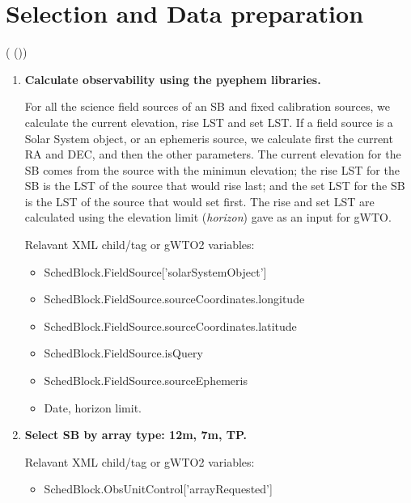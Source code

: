 \documentclass[a4paper,10pt,english]{sphinxmanual}
\begin{document}
\section{Selection and Data preparation}
\label{algorithm:selection}\label{algorithm:selection-and-data-preparation}
({\hyperref[wtoapi:wtoAlgorithm.WtoAlgorithm.selector]{}} ())
\begin{enumerate}
\item {} 
\textbf{Calculate observability using the pyephem libraries.}

For all the science field sources of an SB and fixed calibration sources,
we calculate the current elevation, rise LST and set LST.
If a field source is a Solar System object, or an ephemeris
source, we calculate first the current RA and DEC, and then the other
parameters. The current elevation for the SB comes from the source with the
minimun elevation; the rise LST for the SB is the LST of the source that
would rise last; and the set LST for the SB is the LST of the source that
would set first. The rise and set LST are calculated using the elevation
limit (\emph{horizon}) gave as an input for gWTO.

Relavant XML child/tag or gWTO2 variables:
\begin{itemize}
\item {} 
SchedBlock.FieldSource{[}'solarSystemObject'{]}

\item {} 
SchedBlock.FieldSource.sourceCoordinates.longitude

\item {} 
SchedBlock.FieldSource.sourceCoordinates.latitude

\item {} 
SchedBlock.FieldSource.isQuery

\item {} 
SchedBlock.FieldSource.sourceEphemeris

\item {} 
Date, horizon limit.

\end{itemize}

\item {} 
\textbf{Select SB by array type: 12m, 7m, TP.}

Relavant XML child/tag or gWTO2 variables:
\begin{itemize}
\item {} 
SchedBlock.ObsUnitControl{[}'arrayRequested'{]}


\end{itemize}
\end{enumerate}
\end{document}
